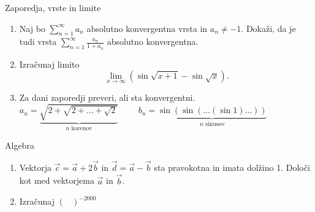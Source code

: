 \begin{frame}{Zaporedja, vrste in limite}
	\begin{enumerate}
		\item 
		Naj bo $\sum_{n=1}^{\infty} a_n$ absolutno konvergentna vrsta in $a_n \ne -1$.
		Dokaži, da je tudi vrsta $\sum_{n=1}^\infty \frac{a_n}{1+a_n}$
		absolutno konvergentna.

		\item
		Izračunaj limito
		$$\lim_{x\to \infty}\left(\sin\sqrt{x+1}-\sin\sqrt{x}\right) .$$

		\item
		Za dani zaporedji preveri, ali sta konvergentni.
		$a_n = \underbrace{\sqrt{2+\sqrt{2+\dots+\sqrt{2}}}}_{n\text{ korenov}} \qquad $
		$b_n = \underbrace{\sin(\sin(\dots(\sin 1)\dots))}_{n\text{ sinusov}} $
	\end{enumerate}
\end{frame}

\begin{frame}{Algebra}
	\begin{enumerate}
		\item
		Vektorja $\vec{c} = \vec{a} + 2\vec{b} $ in $\vec{d} = \vec{a} - \vec{b}$
		sta pravokotna in imata dolžino 1. Določi kot med vektorjema $\vec{a}$ in $\vec{b}$.
		\item 
		Izračunaj
		\( \begin{pmatrix}
			
		\end{pmatrix}^{-2000}
		\)
	\end{enumerate}
\end{frame}

